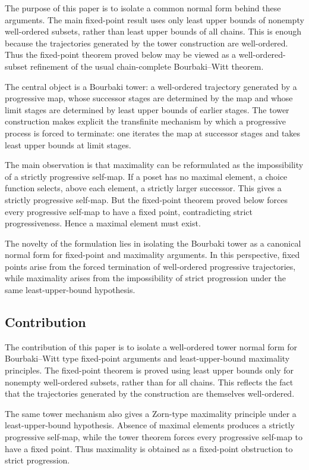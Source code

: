 \documentclass[11pt]{article}
\theoremstyle{definition}
\theoremstyle{remark}
\begin{document}
The purpose of this paper is to isolate a common normal form behind these arguments. The
main fixed-point result uses only least upper bounds of nonempty well-ordered subsets,
rather than least upper bounds of all chains. This is enough because the trajectories
generated by the tower construction are well-ordered. Thus the fixed-point theorem proved
below may be viewed as a well-ordered-subset refinement of the usual chain-complete
Bourbaki--Witt theorem.

The central object is a Bourbaki tower: a well-ordered trajectory generated by a
progressive map, whose successor stages are determined by the map and whose limit stages
are determined by least upper bounds of earlier stages. The tower construction makes
explicit the transfinite mechanism by which a progressive process is forced to terminate:
one iterates the map at successor stages and takes least upper bounds at limit stages.

The main observation is that maximality can be reformulated as the impossibility of a
strictly progressive self-map. If a poset has no maximal element, a choice function selects,
above each element, a strictly larger successor. This gives a strictly progressive self-map.
But the fixed-point theorem proved below forces every progressive self-map to have a fixed point,
contradicting strict progressiveness. Hence a maximal element must exist.

The novelty of the formulation lies in isolating the Bourbaki tower as a canonical normal
form for fixed-point and maximality arguments. In this perspective, fixed points arise
from the forced termination of well-ordered progressive trajectories, while maximality
arises from the impossibility of strict progression under the same least-upper-bound
hypothesis.

\subsection*{Contribution}

The contribution of this paper is to isolate a well-ordered tower normal form for
Bourbaki--Witt type fixed-point arguments and least-upper-bound maximality principles.
The fixed-point theorem is proved using least upper bounds only for nonempty
well-ordered subsets, rather than for all chains. This reflects the fact that the
trajectories generated by the construction are themselves well-ordered.

The same tower mechanism also gives a Zorn-type maximality principle under a
least-upper-bound hypothesis. Absence of maximal elements produces a strictly progressive
self-map, while the tower theorem forces every progressive self-map to have a fixed point.
Thus maximality is obtained as a fixed-point obstruction to strict progression.
\end{document}

